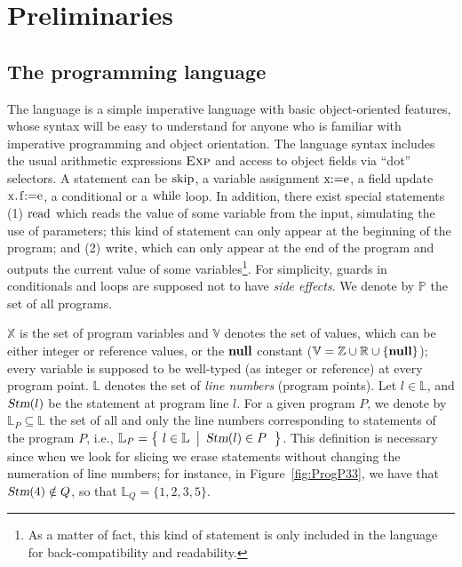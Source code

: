 \documentclass[prodmode,acmtocl]{acmsmall}
\newcommand{\stm}{\mbox{\sl Stm}}
\def\prog{\ensuremath{P}\xspace}
\def\progq{\ensuremath{Q}\xspace}
\def\progs{\ensuremath{\mathbb{P}}\xspace}
\def\variables{\ensuremath{\mathbb{X}}\xspace}
\def\values{\ensuremath{\mathbb{V}}\xspace}
\def\zvalues{\ensuremath{\mathbb{Z}}\xspace}
\def\rvalues{\ensuremath{\mathbb{R}}\xspace}
\def\lnums{\ensuremath{\mathbb{L}}\xspace}
\newcommand{\sset}[2]{\left\{~#1 ~ \left |
                               \begin{array}{l}#2\end{array}
                          \right.     \right\}}
\newcommand{\nil}{\mbox{\bf null}}
\newcommand{\0}{\mbox{\bf 0}}
\newcommand{\CODE}[1]{\ensuremath{\mbox{\lstinline!#1!}\xspace}\xspace}
\def\IMPEXP{{\mbox{\sc Exp}}}
\begin{document}
\section{Preliminaries}
\label{sec:preliminaries}
\subsection{The programming language}
\label{sec:theProgrammingLanguage}

The language is a simple imperative language with basic
object-oriented features, whose syntax will be easy to understand for
anyone who is familiar with imperative programming and object
orientation.  The language syntax includes the usual arithmetic
expressions $\IMPEXP$ and access to object fields via ``dot''
selectors.  A statement can be \CODE{skip}, a variable assignment
\CODE{x:=e}, a field update \CODE{x.f:=e}, a conditional or a
\CODE{while} loop.  In addition, there exist special statements (1)
\CODE{read} which reads the value of some variable from the input,
simulating the use of parameters; this kind of statement can only
appear at the beginning of the program; and (2) \CODE{write}, which
can only appear at the end of the program and outputs the current
value of some variables\footnote{As a matter of fact, this kind of
  statement is only included in the language for back-compatibility
  and readability.}.  For simplicity, guards in conditionals and loops
are supposed not to have \emph{side effects}.  We denote by $\progs$
the set of all programs.

$\variables$ is the set of program variables and $\values$ denotes the
set of values, which can be either integer or reference values, or the
$\nil$ constant ($\values = \zvalues \cup \rvalues \cup \{\nil\}$);
every variable is supposed to be well-typed (as integer or reference)
at every program point.  $\lnums$ denotes the set of \emph{line
  numbers} (program points).  Let $l\in\lnums$, and $\stm(l)$ be the
statement at program line $l$.  For a given program $\prog$, we denote
by $\lnums_\prog\subseteq\lnums$ the set of all and only the line
numbers corresponding to statements of the program $\prog$, i.e.,
$\lnums_\prog=\sset{l\in\lnums}{\stm(l)\in\prog}$.  This definition is
necessary since when we look for slicing we erase statements without
changing the numeration of line numbers; for instance, in
Figure~\ref{fig:ProgP33}, we have that $\stm(4)\notin\progq$, so that
$\lnums_\progq=\{1,2,3,5\}$.
\end{document}
